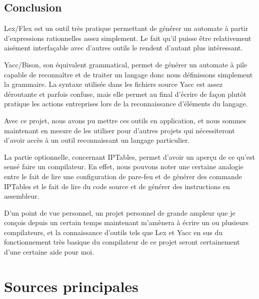 \documentclass[a4paper,11pt]{report}
\begin{document}
\chapter*{Conclusion}

Lex/Flex est un outil très pratique permettant de générer un automate à partir
d'expressions rationnelles assez simplement. Le fait qu'il puisse être
relativement aisément interfaçable avec d'autres outils le rendent d'autant
plus intéressant.

Yacc/Bison, son équivalent grammatical, permet de générer un automate à pile
capable de reconnaître et de traiter un langage donc nous définissons
simplement la grammaire. La syntaxe utilisée dans les fichiers source Yacc est
assez déroutante et parfois confuse, mais elle permet au final d'écrire de
façon plutôt pratique les actions entreprises lors de la reconnaissance
d'éléments du langage.

Avec ce projet, nous avons pu mettre ces outils en application, et nous sommes
maintenant en mesure de les utiliser pour d'autres projets qui nécessiteront
d'avoir accès à un outil reconnaissant un langage particulier.

La partie optionnelle, concernant IPTables, permet d'avoir un aperçu de ce
qu'est sensé faire un compilateur. En effet, nous pouvons noter une certaine
analogie entre le fait de lire une configuration de pare-feu et de générer des
commande IPTables et le fait de lire du code source et de générer des
instructions en assembleur.

D'un point de vue personnel, un projet personnel de grande ampleur que je
conçois depuis un certain temps maintenant m'amènera à écrire un ou plusieurs
compilateurs, et la connaissance d'outils tels que Lex et Yacc en sus du
fonctionnement très basique du \og compilateur\fg{} de ce projet seront
certainement d'une certaine aide pour moi.

\appendix

\part*{Sources principales}
\end{document}
